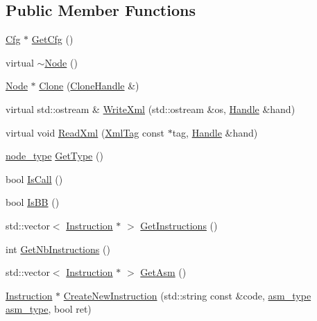 \subsection*{Public Member Functions}
\begin{DoxyCompactItemize}
\item 
\hyperlink{classcfglib_1_1Cfg}{Cfg} $\ast$ \hyperlink{classcfglib_1_1Node_aba4169d7a66bceb6b5ae4e62193f669d}{Get\+Cfg} ()
\item 
virtual \hyperlink{classcfglib_1_1Node_a3ff420dfcc34125601765f1ab3444d66}{$\sim$\+Node} ()
\item 
\hyperlink{classcfglib_1_1Node}{Node} $\ast$ \hyperlink{classcfglib_1_1Node_a5f9b90a1d189124c775e0af9c209d208}{Clone} (\hyperlink{classcfglib_1_1CloneHandle}{Clone\+Handle} \&)
\item 
virtual std\+::ostream \& \hyperlink{classcfglib_1_1Node_a648aaa3e2703c9b5932bc50ffb14942c}{Write\+Xml} (std\+::ostream \&os, \hyperlink{classcfglib_1_1Handle}{Handle} \&hand)
\item 
virtual void \hyperlink{classcfglib_1_1Node_aaab769075e5d02c61411d58fc94e2070}{Read\+Xml} (\hyperlink{classXmlTag}{Xml\+Tag} const $\ast$tag, \hyperlink{classcfglib_1_1Handle}{Handle} \&hand)
\item 
\hyperlink{namespacecfglib_a44952a45d827aaa271f7e7dac5bf7752}{node\+\_\+type} \hyperlink{classcfglib_1_1Node_a92716d47e55c6808c641ac2fab7e26e2}{Get\+Type} ()
\item 
bool \hyperlink{classcfglib_1_1Node_a544488e1ba481dae0d55f2b826ac84a9}{Is\+Call} ()
\item 
bool \hyperlink{classcfglib_1_1Node_a2813d33e1f4b848f6f14f2744cb17dfe}{Is\+BB} ()
\item 
std\+::vector$<$ \hyperlink{classcfglib_1_1Instruction}{Instruction} $\ast$ $>$ \hyperlink{classcfglib_1_1Node_ad7e384556d7ab828b5e95536063668ad}{Get\+Instructions} ()
\item 
int \hyperlink{classcfglib_1_1Node_a305a0c9ac27d6840536be1ccbcea29d3}{Get\+Nb\+Instructions} ()
\item 
std\+::vector$<$ \hyperlink{classcfglib_1_1Instruction}{Instruction} $\ast$ $>$ \hyperlink{classcfglib_1_1Node_a75ef37984de980ec3866b68eb23864ae}{Get\+Asm} ()
\item 
\hyperlink{classcfglib_1_1Instruction}{Instruction} $\ast$ \hyperlink{classcfglib_1_1Node_ae0dc5993e16a3b637522c02819703833}{Create\+New\+Instruction} (std\+::string const \&code, \hyperlink{namespacecfglib_a5ae32d51cf4ff1db5485367eab63a500}{asm\+\_\+type} \hyperlink{namespacecfglib_a5ae32d51cf4ff1db5485367eab63a500}{asm\+\_\+type}, bool ret)

\end{DoxyCompactItemize}
